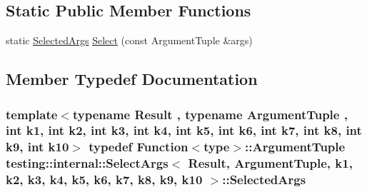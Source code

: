 \subsection*{Static Public Member Functions}
\begin{DoxyCompactItemize}
\item 
static \hyperlink{classtesting_1_1internal_1_1SelectArgs_ad1eaa794653b3f4cefdb5c2285b418a7}{Selected\+Args} \hyperlink{classtesting_1_1internal_1_1SelectArgs_a372c597a96263b29d59fdb08183bc2e1}{Select} (const Argument\+Tuple \&args)
\end{DoxyCompactItemize}


\subsection{Member Typedef Documentation}
\subsubsection[{\texorpdfstring{Selected\+Args}{SelectedArgs}}]{\setlength{\rightskip}{0pt plus 5cm}template$<$typename Result , typename Argument\+Tuple , int k1, int k2, int k3, int k4, int k5, int k6, int k7, int k8, int k9, int k10$>$ typedef {\bf Function}$<${\bf type}$>$\+::Argument\+Tuple {\bf testing\+::internal\+::\+Select\+Args}$<$ Result, Argument\+Tuple, k1, k2, k3, k4, k5, k6, k7, k8, k9, k10 $>$\+::{\bf Selected\+Args}}\hypertarget{classtesting_1_1internal_1_1SelectArgs_ad1eaa794653b3f4cefdb5c2285b418a7}{}\label{classtesting_1_1internal_1_1SelectArgs_ad1eaa794653b3f4cefdb5c2285b418a7}
